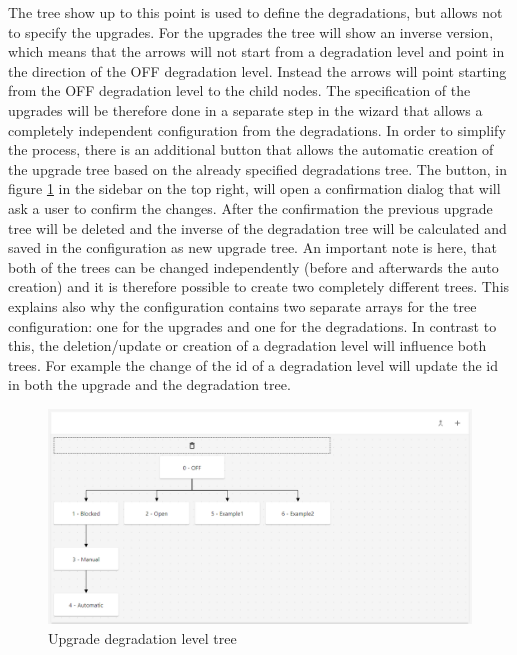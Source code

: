 The tree show up to this point is used to define the degradations, but allows not to specify the upgrades. For the upgrades the tree will show an inverse version, which means that the arrows will not start from a degradation level and point in the direction of the OFF degradation level. Instead the arrows will point starting from the OFF degradation level to the child nodes.
The specification of the upgrades will be therefore done in a separate step in the wizard that allows a completely independent configuration from the degradations. In order to simplify the process, there is an additional button that allows the automatic creation of the upgrade tree based on the already specified degradations tree. The button, in figure \ref{fig:upgrade_level_tree_drop} in the sidebar on the top right, will open a confirmation dialog that will ask a user to confirm the changes. After the confirmation the previous upgrade tree will be deleted and the inverse of the degradation tree will be calculated and saved in the configuration as new upgrade tree. An important note is here, that both of the trees can be changed independently (before and afterwards the auto creation) and it is therefore possible to create two completely different trees. This explains also why the configuration contains two separate arrays for the tree configuration: one for the upgrades and one for the degradations. In contrast to this, the deletion/update or creation of a degradation level will influence both trees. For example the change of the id of a degradation level will update the id in both the upgrade and the degradation tree.

\begin{figure}[ht]
    \centering
    \includegraphics[width=\textwidth]{img/upgrade_tree.png}
    \caption{Upgrade degradation level tree}
    \label{fig:upgrade_level_tree_drop}
\end{figure}




